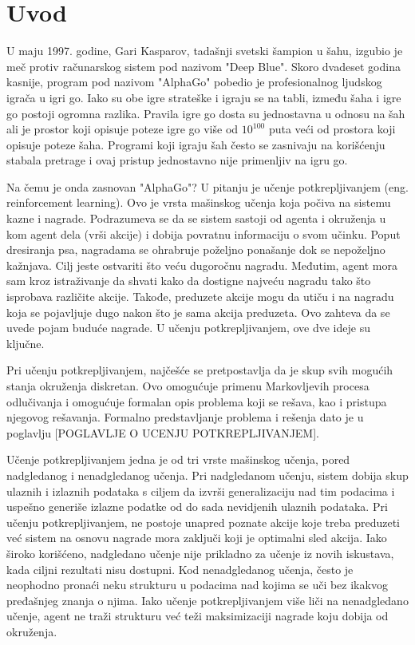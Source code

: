 \chapter{Uvod}



U maju 1997. godine, Gari Kasparov, tadašnji svetski šampion u šahu, izgubio je meč protiv računarskog sistem pod nazivom "Deep Blue". Skoro dvadeset godina kasnije, program pod nazivom "AlphaGo" pobedio je profesionalnog ljudskog igrača u igri go. Iako su obe igre strateške i igraju se na tabli, između šaha i igre go postoji ogromna razlika. Pravila igre go dosta su jednostavna u odnosu na šah ali je prostor koji opisuje poteze igre go više od $10^{100}$ puta veći od prostora koji opisuje poteze šaha. Programi koji igraju šah često se zasnivaju na korišćenju stabala pretrage i ovaj pristup jednostavno nije primenljiv na igru go. 

Na čemu je onda zasnovan "AlphaGo"? U pitanju je učenje potkrepljivanjem (eng. reinforcement learning). Ovo je vrsta mašinskog učenja koja počiva na sistemu kazne i nagrade. Podrazumeva se da se sistem sastoji od agenta i okruženja u kom agent dela (vrši akcije) i dobija povratnu informaciju o svom učinku. Poput dresiranja psa, nagradama se ohrabruje poželjno ponašanje dok se nepoželjno kažnjava. Cilj jeste ostvariti što veću dugoročnu nagradu. Međutim, agent mora sam kroz istraživanje da shvati kako da dostigne najveću nagradu tako što isprobava različite akcije. Takođe, preduzete akcije mogu da utiču i na nagradu koja se pojavljuje dugo nakon što je sama akcija preduzeta. Ovo zahteva da se uvede pojam buduće nagrade. U učenju potkrepljivanjem, ove dve ideje su ključne.

Pri učenju potkrepljivanjem, najčešće se pretpostavlja da je skup svih mogućih stanja okruženja diskretan. Ovo omogućuje primenu Markovljevih procesa odlučivanja i omogućuje formalan opis problema koji se rešava, kao i pristupa njegovog rešavanja. Formalno predstavljanje problema i rešenja dato je u poglavlju [POGLAVLJE O UCENJU POTKREPLJIVANJEM].

Učenje potkrepljivanjem jedna je od tri vrste mašinskog učenja, pored nadgledanog i nenadgledanog učenja. Pri nadgledanom učenju, sistem dobija skup ulaznih i izlaznih podataka s ciljem da izvrši generalizaciju nad tim podacima i uspešno generiše izlazne podatke od do sada nevidjenih ulaznih podataka. Pri učenju potkrepljivanjem, ne postoje unapred poznate akcije koje treba preduzeti već sistem na osnovu nagrade mora zaključi koji je optimalni sled akcija. Iako široko korišćeno, nadgledano učenje nije prikladno za učenje iz novih iskustava, kada ciljni rezultati nisu dostupni.  Kod nenadgledanog učenja, često je neophodno pronaći neku strukturu u podacima nad kojima se uči bez ikakvog pređašnjeg znanja o njima. Iako učenje potkrepljivanjem više liči na nenadgledano učenje, agent ne traži strukturu već teži maksimizaciji nagrade koju dobija od okruženja. 

